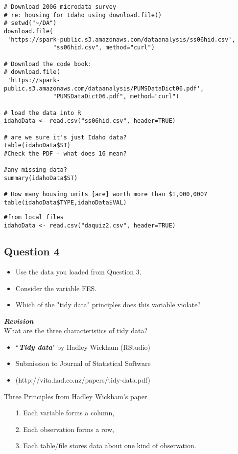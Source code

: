 \documentclass[]{article}
\begin{document}
\begin{framed}
\begin{verbatim}
# Download 2006 microdata survey 
# re: housing for Idaho using download.file()
# setwd("~/DA")
download.file(
 'https://spark-public.s3.amazonaws.com/dataanalysis/ss06hid.csv',
              "ss06hid.csv", method="curl")

# Download the code book:
# download.file(
 'https://spark-public.s3.amazonaws.com/dataanalysis/PUMSDataDict06.pdf',
              "PUMSDataDict06.pdf", method="curl")

# load the data into R
idahoData <- read.csv("ss06hid.csv", header=TRUE)

# are we sure it's just Idaho data?
table(idahoData$ST)
#Check the PDF - what does 16 mean?

#any missing data?
summary(idahoData$ST)

# How many housing units [are] worth more than $1,000,000?
table(idahoData$TYPE,idahoData$VAL)
\end{verbatim}
\end{framed}

\begin{framed}
\begin{verbatim}
#from local files
idahoData <- read.csv("daquiz2.csv", header=TRUE)

\end{verbatim}
\end{framed}

\newpage
\subsection*{ Question 4}

\begin{itemize}
\item Use the data you loaded from Question 3. 
\item Consider the variable FES. 
\item Which of the "tidy data" principles does this variable violate?
\end{itemize}

\textbf{\textit{Revision}}\\
What are the three characteristics of tidy data?

\begin{itemize}
\item ``\textit{\textbf{Tidy data}}" by Hadley Wickham (RStudio)
\item Submission to Journal of Statistical Software
\item (http://vita.had.co.nz/papers/tidy-data.pdf)
\end{itemize}
Three Principles from Hadley Wickham's paper
\begin{itemize}
\item[1.] Each variable forms a column, 
\item[2.] Each observation forms a row, 
\item[3.] Each table/file stores data about one kind of observation.
\end{itemize}
\end{document}
